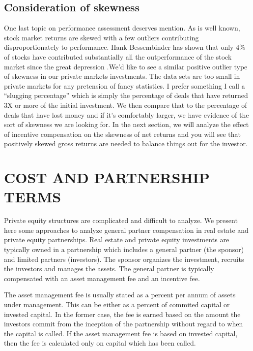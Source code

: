 \documentclass[12pt,english]{article}\usepackage[]{graphicx}\usepackage[]{color}
\newenvironment{lyxcode}
	{\par\begin{list}{}{
		\setlength{\rightmargin}{\leftmargin}
		\setlength{\listparindent}{0pt}%
		\raggedright
		\setlength{\itemsep}{0pt}
		\setlength{\parsep}{0pt}
		\normalfont\ttfamily}%
	 \item[]}
	{\end{list}}
\begin{document}
\subsection*{Consideration of skewness}

One last topic on performance assessment deserves mention. As is well
known, stock market returns are skewed with a few outliers contributing
disproportionately to performance. Hank Bessembinder has shown that
only 4\% of stocks have contributed substantially all the outperformance
of the stock market since the great depression \parencite{Bessembinder2019}.We'd
like to see a similar positive outlier type of skewness in our private
markets investments. The data sets are too small in private markets
for any pretension of fancy statistics. I prefer something I call
a ``slugging percentage'' which is simply the percentage of deals
that have returned 3X or more of the initial investment. We then compare
that to the percentage of deals that have lost money and if it's comfortably
larger, we have evidence of the sort of skewness we are looking for.
In the next section, we will analyze the effect of incentive compensation
on the skewness of net returns and you will see that positively skewed
gross returns are needed to balance things out for the investor.
\begin{lyxcode}
\end{lyxcode}

\section*{COST AND PARTNERSHIP TERMS}

Private equity structures are complicated and difficult to analyze.
We present here some approaches to analyze general partner compensation
in real estate and private equity partnerships. Real estate and private
equity investments are typically owned in a partnership which includes
a general partner (the \textquotedbl sponsor\textquotedbl ) and
limited partners (\textquotedbl investors\textquotedbl ). The sponsor
organizes the investment, recruits the investors and manages the assets.
The general partner is typically compensated with an asset management
fee and an incentive fee.

The asset management fee is usually stated as a percent per annum
of assets under management. This can be either as a percent of \textquotedbl commited\textquotedbl{}
capital or \textquotedbl invested\textquotedbl{} capital. In the
former case, the fee is earned based on the amount the investors commit
from the inception of the partnership without regard to when the capital
is called. If the asset management fee is based on invested capital,
then the fee is calculated only on capital which has been called. 
\end{document}
